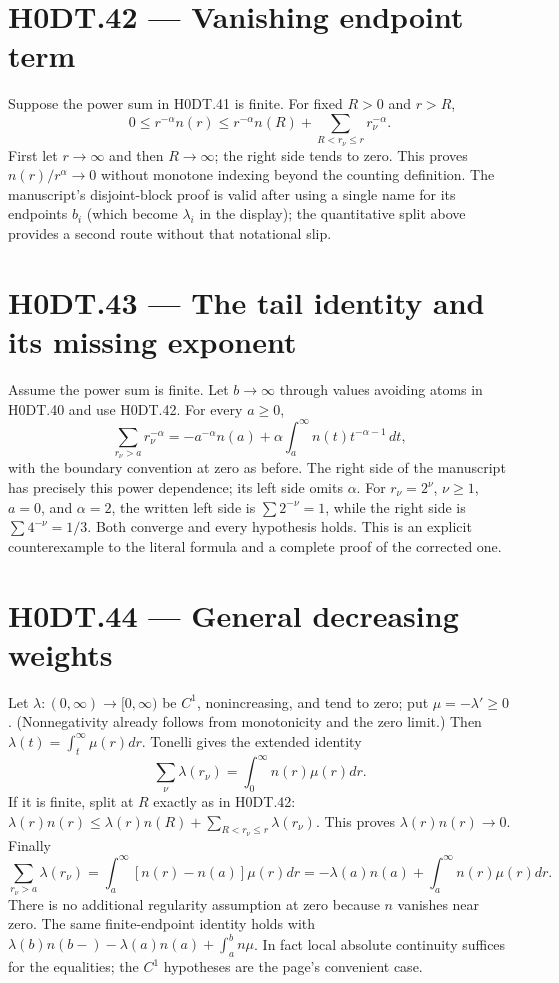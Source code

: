 \section*{H0DT.42 --- Vanishing endpoint term}
Suppose the power sum in H0DT.41 is finite. For fixed $R>0$ and $r>R$,
\[
 0\le r^{-\alpha}n(r)
 \le r^{-\alpha}n(R)+\sum_{R<r_\nu\le r}r_\nu^{-\alpha}.
\]
First let $r\to\infty$ and then $R\to\infty$; the right side tends to zero. This proves $n(r)/r^\alpha\to0$ without monotone indexing beyond the counting definition. The manuscript's disjoint-block proof is valid after using a single name for its endpoints $b_i$ (which become $\lambda_i$ in the display); the quantitative split above provides a second route without that notational slip.

\section*{H0DT.43 --- The tail identity and its missing exponent}
Assume the power sum is finite. Let $b\to\infty$ through values avoiding atoms in H0DT.40 and use H0DT.42. For every $a\ge0$,
\[
 \sum_{r_\nu>a}r_\nu^{-\alpha}
 =-a^{-\alpha}n(a)+\alpha\int_a^\infty n(t)t^{-\alpha-1}\,dt,
\]
with the boundary convention at zero as before. The right side of the manuscript has precisely this power dependence; its left side omits $\alpha$. For $r_\nu=2^\nu$, $\nu\ge1$, $a=0$, and $\alpha=2$, the written left side is $\sum2^{-\nu}=1$, while the right side is $\sum4^{-\nu}=1/3$. Both converge and every hypothesis holds. This is an explicit counterexample to the literal formula and a complete proof of the corrected one.

\section*{H0DT.44 --- General decreasing weights}
Let $\lambda:(0,\infty)\to[0,\infty)$ be $C^1$, nonincreasing, and tend to zero; put $\mu=-\lambda'\ge0$. (Nonnegativity already follows from monotonicity and the zero limit.) Then $\lambda(t)=\int_t^\infty\mu(r)dr$. Tonelli gives the extended identity
\[
 \sum_\nu\lambda(r_\nu)=\int_0^\infty n(r)\mu(r)dr.
\]
If it is finite, split at $R$ exactly as in H0DT.42:
$\lambda(r)n(r)\le\lambda(r)n(R)+\sum_{R<r_\nu\le r}\lambda(r_\nu)$.
This proves $\lambda(r)n(r)\to0$. Finally
\[
 \sum_{r_\nu>a}\lambda(r_\nu)
 =\int_a^\infty[n(r)-n(a)]\mu(r)dr
 =-\lambda(a)n(a)+\int_a^\infty n(r)\mu(r)dr.
\]
There is no additional regularity assumption at zero because $n$ vanishes near zero. The same finite-endpoint identity holds with $\lambda(b)n(b-)-\lambda(a)n(a)+\int_a^bn\mu$. In fact local absolute continuity suffices for the equalities; the $C^1$ hypotheses are the page's convenient case.

